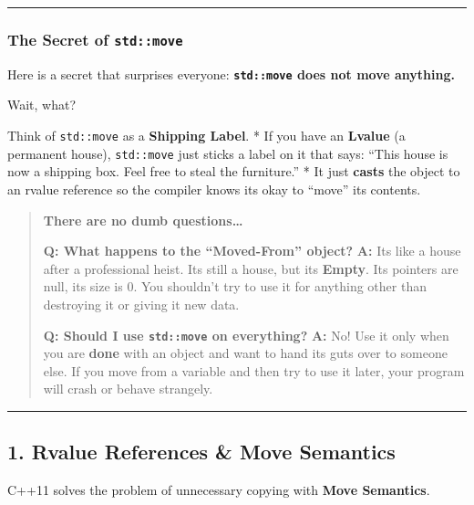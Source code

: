\begin{center}\rule{0.5\linewidth}{0.5pt}\end{center}

\hypertarget{the-secret-of-stdmove}{%
\subsubsection{\texorpdfstring{The Secret of
\texttt{std::move}}{The Secret of std::move}}\label{the-secret-of-stdmove}}

Here is a secret that surprises everyone:
\textbf{\passthrough{\lstinline!std::move!} does not move anything.}

Wait, what?

Think of \passthrough{\lstinline!std::move!} as a \textbf{Shipping
Label}. * If you have an \textbf{Lvalue} (a permanent house),
\passthrough{\lstinline!std::move!} just sticks a label on it that says:
``This house is now a shipping box. Feel free to steal the furniture.''
* It just \textbf{casts} the object to an rvalue reference so the
compiler knows its okay to ``move'' its contents.

\begin{quote}
\textbf{There are no dumb questions\ldots{}}

\textbf{Q: What happens to the ``Moved-From'' object?} \textbf{A:} Its
like a house after a professional heist. Its still a house, but its
\textbf{Empty}. Its pointers are null, its size is 0. You shouldn't try
to use it for anything other than destroying it or giving it new data.

\textbf{Q: Should I use \passthrough{\lstinline!std::move!} on
everything?} \textbf{A:} No! Use it only when you are \textbf{done} with
an object and want to hand its guts over to someone else. If you move
from a variable and then try to use it later, your program will crash or
behave strangely.
\end{quote}

\begin{center}\rule{0.5\linewidth}{0.5pt}\end{center}

\hypertarget{rvalue-references-move-semantics}{%
\subsection{1. Rvalue References \& Move
Semantics}\label{rvalue-references-move-semantics}}

C++11 solves the problem of unnecessary copying with \textbf{Move
Semantics}.

